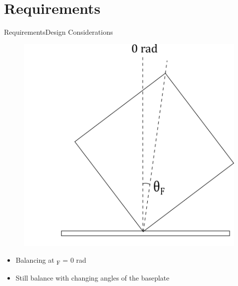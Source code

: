 
\section{Requirements}

\begin{frame}{Requirements}{Design Considerations}
	
	\begin{figure}[H]
		\includegraphics[scale=0.4]{Pictures/reqCubli0rad.png}
		\centering
	\end{figure}
	
\begin{itemize}
 \item {Balancing at \si{\theta_F} =  0 rad}
 \linebreak
\item {Still balance with changing angles of the baseplate}
\end{itemize}


\end{frame}


